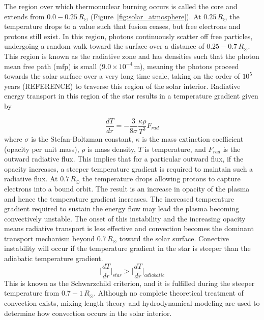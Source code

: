 The region over which thermonuclear burning occurs is called the core and extends from $0.0-0.25\,R_{\odot}$ (Figure~\ref{fig:solar_atmosphere}). At $0.25\,R_{\odot}$ the temperature drops to a value such that fusion ceases, but free electrons and protons still exist. In this region, photons continuously scatter off free particles, undergoing a random walk toward the surface over a distance of $0.25-0.7\,R_{\odot}$. This region is known as the radiative zone and has densities such that the photon mean free path (mfp) is small ($9.0\times10^{-4}$\,m), meaning the photons proceed towards the solar surface over a very long time scale, taking on the order of $10^{5}$ years (REFERENCE) to traverse this region of the solar interior. Radiative energy transport in this region of the star results in a temperature gradient given by 

\begin{equation}
\frac{dT}{dr} = -\frac{3}{8 \sigma}\frac{\kappa \rho}{T^3}F_{rad}
\end{equation}
where $\sigma$ is the Stefan-Boltzman constant, $\kappa$ is the mass extinction coefficient (opacity per unit mass), $\rho$ is mass density, $T$ is temperature, and $F_{rad}$ is the outward radiative flux. This implies that for a particular outward flux, if the opacity increases, a steeper temperature gradient is required to maintain such a radiative flux. At $0.7\,R_{\odot}$ the temperature drops allowing protons to capture electrons into a bound orbit. The result is an increase in opacity of the plasma and hence the temperature gradient increases. The increased temperature gradient required to sustain the energy flow may lead the plasma becoming convectively unstable. The onset of this instability and the increasing opacity means radiative transport is less effective and convection becomes the dominant transport mechanism beyond $0.7\,R_{\odot}$ toward the solar surface. Conective instability will occur if the temperature gradient in the star is steeper than the adiabatic temperature gradient.
\begin{equation}
\Bigg|\frac{dT}{dr}\Bigg|_{star} > \Bigg|\frac{dT}{dr}\Bigg|_{adiabatic}
\end{equation}
This is known as the Schwarzchild criterion, and it is fulfilled during the steeper temperature from $0.7-1\,R_{\odot}$. Although no complete theoretical treatment of convection exists, mixing length theory and hydrodynamical modeling are used to determine how convection occurs in the solar interior.

